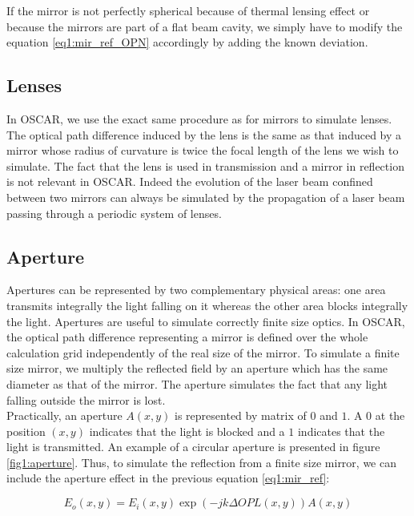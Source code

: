 If the mirror is not perfectly spherical because of thermal lensing effect or because the mirrors are part of a flat beam cavity, we simply have to modify the equation \ref{eq1:mir_ref_OPN} accordingly by adding the known deviation.


\subsection{Lenses}

In OSCAR, we use the exact same procedure as for mirrors to simulate lenses. The optical path difference induced by the lens is the same as that induced by a mirror whose radius of curvature is twice the focal length of the lens we wish to simulate. The fact that the lens is used in transmission and a mirror in reflection is not relevant in OSCAR. Indeed the evolution of the laser beam confined between two mirrors can always be simulated by the propagation of a laser beam passing through a periodic system of lenses\cite{Kogelnik}.


\subsection{Aperture}

\label{sec1:aperture}

Apertures can be represented by two complementary physical areas: one area transmits integrally the light falling on it whereas the other area blocks integrally the light. Apertures are useful to simulate correctly finite size optics. In OSCAR, the optical path difference representing a mirror is defined over the whole calculation grid independently of the real size of the mirror. To simulate a finite size mirror, we multiply the reflected field by an aperture which has the same diameter as that of the mirror. The aperture simulates the fact that any light falling outside the mirror is lost.\\

Practically, an aperture $A(x,y)$ is represented by matrix of $0$ and $1$. A $0$ at the position $(x,y)$ indicates that the light is blocked and a $1$ indicates that the light is transmitted. An example of a circular aperture is presented in figure \ref{fig1:aperture}. Thus, to simulate the reflection from a finite size mirror, we can include the aperture effect in the previous equation \ref{eq1:mir_ref}:

\begin{equation}
E_o(x,y) = E_i(x,y) \exp{(-j k \Delta OPL(x,y))} A(x,y)
\end{equation}


